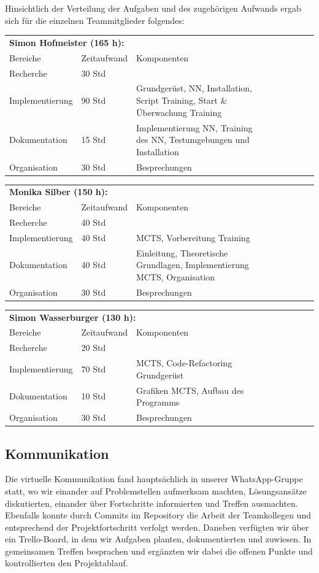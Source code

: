 \documentclass[12pt,a4paper]{article}
\begin{document}
Hinsichtlich der Verteilung der Aufgaben und des zugehörigen Aufwands ergab sich für die einzelnen Teammitglieder folgendes:

\begin{tabular}{*{3}{p{4cm}p{3cm}p{8cm}}}
\multicolumn{3}{l}{\textbf{Simon Hofmeister (165 h):}} \\
Bereiche & Zeitaufwand & Komponenten \\
\cline{1-3}
Recherche & 30 Std &  \\
Implementierung & 90 Std & Grundgerüst, NN, Installation, Script Training, Start \& Überwachung Training  \\
Dokumentation & 15 Std & Implementierung NN, Training des NN, Testumgebungen und Installation \\
Organisation & 30 Std &  Besprechungen\\
\end{tabular}


\begin{tabular}{*{3}{p{4cm}p{3cm}p{8cm}}}
\multicolumn{3}{l}{\textbf{Monika Silber (150 h):}} \\
Bereiche & Zeitaufwand & Komponenten \\
\cline{1-3}
Recherche & 40 Std &  \\
Implementierung & 40 Std & MCTS, Vorbereitung Training  \\
Dokumentation & 40 Std &  Einleitung, Theoretische Grundlagen, Implementierung MCTS, Organisation \\
Organisation & 30 Std &  Besprechungen\\
\end{tabular}


\begin{tabular}{*{3}{p{4cm}p{3cm}p{8cm}}}
\multicolumn{3}{l}{\textbf{Simon Wasserburger (130 h):}} \\
Bereiche & Zeitaufwand & Komponenten \\
\cline{1-3}
Recherche & 20 Std &  \\
Implementierung & 70 Std & MCTS, Code-Refactoring Grundgerüst  \\
Dokumentation & 10 Std &  Grafiken MCTS, Aufbau des Programms \\
Organisation & 30 Std &  Besprechungen\\
\end{tabular}

\subsection{Kommunikation}
Die virtuelle Kommunikation fand hauptsächlich in unserer WhatsApp-Gruppe statt, wo wir einander auf Problemstellen aufmerksam machten, Lösungsansätze diskutierten, einander über Fortschritte informierten und Treffen ausmachten. Ebenfalls konnte durch Commits im Repository die Arbeit der Teamkollegen und entsprechend der Projektfortschritt verfolgt werden. Daneben verfügten wir über ein Trello-Board, in dem wir Aufgaben planten, dokumentierten und zuwiesen. In gemeinsamen Treffen besprachen und ergänzten wir dabei die offenen Punkte und kontrollierten den Projektablauf. 
\end{document}
